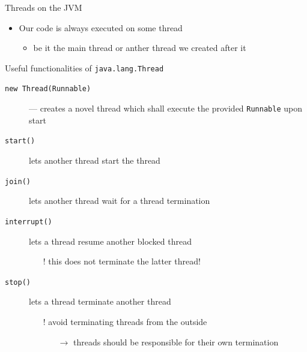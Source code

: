 \documentclass[presentation]{beamer}\mode<presentation>{\usetheme{AMSBolognaFC}}
\begin{document}
\begin{frame}[allowframebreaks]
\begin{block}{Threads on the JVM}
\begin{itemize}
            \item Our code is always executed on some thread
            \begin{itemize}
                \item be it the main thread or anther thread we created after it
            \end{itemize}
        \end{itemize}
    \end{block}

    \begin{exampleblock}{Useful functionalities of \texttt{java.lang.Thread}}
        \begin{description}
            \item[\texttt{new Thread(Runnable)}] --- creates a novel thread which shall execute the provided \texttt{Runnable} upon start

            \item[\texttt{start()}] lets another thread start the thread

            \item[\texttt{join()}] lets another thread wait for a thread termination

            \item[\texttt{interrupt()}] lets a thread resume another \alert{blocked} thread
            \begin{itemize}
                \item[!] this does not terminate the latter thread!
            \end{itemize}

            \item[\texttt{stop()}] lets a thread terminate another thread
            \begin{itemize}
                \item[!] avoid terminating threads from the outside
                \begin{itemize}
                    \item[$\rightarrow$] threads should be responsible for their own termination
                \end{itemize}
            \end{itemize}
        \end{description}
    \end{exampleblock}

    \framebreak

    


\end{frame}
\end{document}
